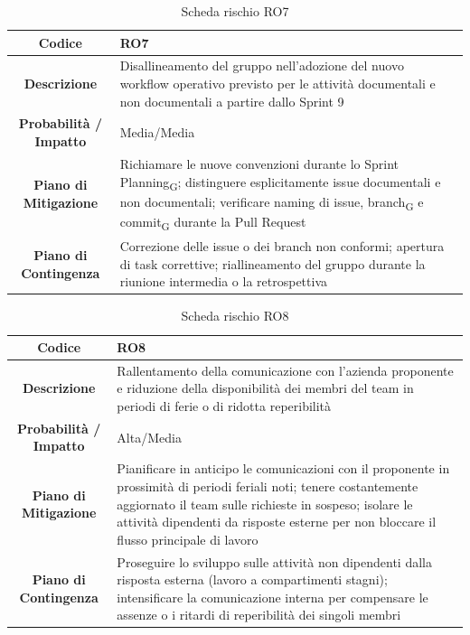 \begin{table}[H]
	\centering
	\renewcommand{\arraystretch}{1.3}
	\begin{tabularx}{\textwidth}{|c|X|}
		\hline
		\textbf{Codice} & \textbf{RO7} \\
		\hline
		\textbf{Descrizione} & Disallineamento del gruppo nell'adozione del nuovo workflow operativo previsto per le attività documentali e non documentali a partire dallo Sprint 9 \\
		\hline
		\textbf{Probabilità / Impatto} & Media/Media \\
		\hline
		\textbf{Piano di Mitigazione} & Richiamare le nuove convenzioni durante lo Sprint Planning\textsubscript{G}; distinguere esplicitamente issue documentali e non documentali; verificare naming di issue, branch\textsubscript{G} e commit\textsubscript{G} durante la Pull Request \\
		\hline
		\textbf{Piano di Contingenza} & Correzione delle issue o dei branch non conformi; apertura di task correttive; riallineamento del gruppo durante la riunione intermedia o la retrospettiva \\
		\hline
	\end{tabularx}
	\caption{Scheda rischio RO7}
\end{table}

\begin{table}[H]
	\centering
	\renewcommand{\arraystretch}{1.3}
	\begin{tabularx}{\textwidth}{|c|X|}
		\hline
		\textbf{Codice} & \textbf{RO8} \\
		\hline
		\textbf{Descrizione} & Rallentamento della comunicazione con l'azienda proponente e riduzione della disponibilità dei membri del team in periodi di ferie o di ridotta reperibilità \\
		\hline
		\textbf{Probabilità / Impatto} & Alta/Media \\
		\hline
		\textbf{Piano di Mitigazione} & Pianificare in anticipo le comunicazioni con il proponente in prossimità di periodi feriali noti; tenere costantemente aggiornato il team sulle richieste in sospeso; isolare le attività dipendenti da risposte esterne per non bloccare il flusso principale di lavoro \\
		\hline
		\textbf{Piano di Contingenza} & Proseguire lo sviluppo sulle attività non dipendenti dalla risposta esterna (lavoro a compartimenti stagni); intensificare la comunicazione interna per compensare le assenze o i ritardi di reperibilità dei singoli membri \\
		\hline
	\end{tabularx}
	\caption{Scheda rischio RO8}
\end{table}

